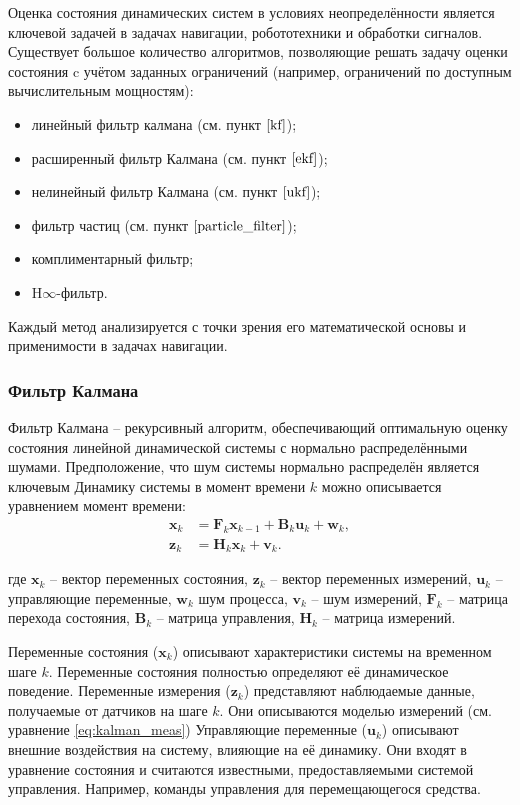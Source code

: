 Оценка состояния динамических систем в условиях неопределённости является ключевой задачей в задачах навигации,
робототехники и обработки сигналов.
Существует большое количество алгоритмов, позволяющие решать задачу оценки состояния
c учётом заданных ограничений (например, ограничений по доступным вычислительным мощностям):
\begin{itemize}
	\item линейный фильтр калмана (см. пункт $\ref{kf}$);
	\item расширенный фильтр Калмана (см. пункт $\ref{ekf}$);
	\item нелинейный фильтр Калмана (см. пункт $\ref{ukf}$);
	\item фильтр частиц (см. пункт $\ref{particle_filter}$);
	\item комплиментарный фильтр;
	\item H$\infty$-фильтр.
\end{itemize}
Каждый метод анализируется с точки зрения его математической основы и применимости в задачах навигации.

\subsubsection{Фильтр Калмана}
\label{kf}
\hfill

Фильтр Калмана -- рекурсивный алгоритм,
обеспечивающий оптимальную оценку состояния линейной динамической системы с нормально распределёнными шумами.
Предположение, что шум системы нормально распределён является ключевым 
Динамику системы в момент времени \( k \) можно описывается уравнением момент времени:
\begin{align}
    \mathbf{x}_k &= \mathbf{F}_k \mathbf{x}_{k-1} + \mathbf{B}_k \mathbf{u}_k + \mathbf{w}_k, \label{eq:kalman_state} \\
    \mathbf{z}_k &= \mathbf{H}_k \mathbf{x}_k + \mathbf{v}_k. \label{eq:kalman_meas}
\end{align}

где \(\mathbf{x}_k\) -- вектор переменных состояния, \(\mathbf{z}_k\) -- вектор переменных измерений,
\(\mathbf{u}_k\) -- управляющие переменные, \(\mathbf{w}_k\) шум процесса,
\(\mathbf{v}_k \) -- шум измерений, \(\mathbf{F}_k\) -- матрица перехода состояния,
\(\mathbf{B}_k\) -- матрица управления, \(\mathbf{H}_k\) -- матрица измерений.

Переменные состояния (\(\mathbf{x}_k\)) описывают характеристики системы на временном шаге \( k \).
Переменные состояния полностью определяют её динамическое поведение.
Переменные измерения (\(\mathbf{z}_k\)) представляют наблюдаемые данные, получаемые от датчиков на шаге \( k \). 
Они описываются моделью измерений (см. уравнение \ref{eq:kalman_meas})
Управляющие переменные (\(\mathbf{u}_k\)) описывают внешние воздействия на систему, влияющие на её динамику.
Они входят в уравнение состояния и считаются известными, предоставляемыми системой управления.
Например, команды управления для перемещающегося средства.

